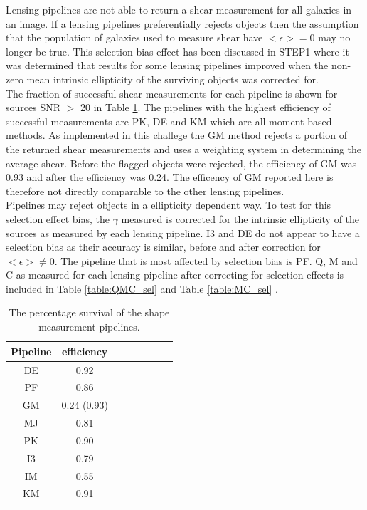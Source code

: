 Lensing pipelines are not able to return 
a shear measurement for all galaxies in an
image. If a lensing pipelines preferentially rejects 
objects then the assumption that the population of galaxies used to
measure shear have $< \epsilon > = 0 $ may no longer be true. 
This selection bias effect has been discussed in STEP1 
where it was determined that results for some lensing pipelines  
improved when the non-zero mean intrinsic ellipticity of the surviving 
objects was corrected for. \\
\indent The fraction of successful shear measurements
 for each pipeline is shown for sources SNR $>$ 20 in Table \ref{table:sur_sel}.
The pipelines with the highest efficiency of successful measurements
are PK, DE and KM which are all moment based methods. 
As implemented in this challege the GM method
rejects a portion of the returned shear measurements and 
uses a weighting system in determining the average shear. Before the
flagged objects were rejected, the efficiency of GM was 0.93 and after
the efficiency was 0.24. The efficency of GM reported here is
therefore not directly comparable to the other lensing pipelines. 
\\
\indent
Pipelines may reject objects in a ellipticity dependent way. To test
for this selection effect bias, the $\gamma$ measured is corrected for
the intrinsic ellipticity of the sources as measured by each lensing
pipeline. I3 and DE do not appear to have a selection bias as their
accuracy is similar, before and after correction for $< \epsilon > \neq 0 $. The
pipeline that is most affected by selection bias is PF. Q, M and C as measured for each
lensing pipeline after correcting for selection effects is included in
Table \ref{table:QMC_sel} and Table \ref{table:MC_sel} . 
\begin{table}
        \centering
        \begin{tabular}{|c|c|c|c|c|c|c|c|}  
          \hline
          Pipeline  &  efficiency \\
          \hline
          DE &  0.92 \\
          \hline
          PF & 0.86 \\
          \hline
          GM & 0.24 (0.93) \\
          \hline
          MJ & 0.81 \\
          \hline
          PK & 0.90 \\
          \hline
          I3 &  0.79 \\
          \hline
          IM &  0.55 \\
          \hline
          KM & 0.91 \\
          \hline
        \end{tabular}
        \caption{The percentage survival of the shape measurement pipelines.}
    \label{table:sur_sel}
\end{table}



